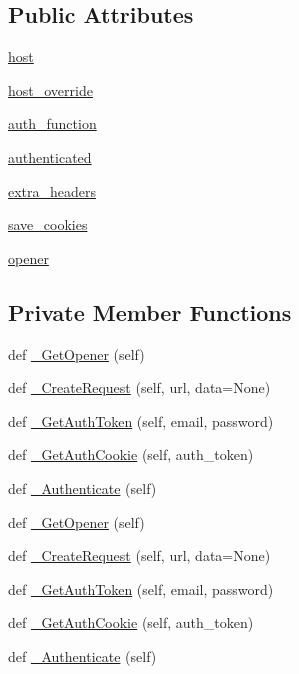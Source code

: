 \subsection*{Public Attributes}
\begin{DoxyCompactItemize}
\item 
\hyperlink{classupload_1_1AbstractRpcServer_ab7188d827e2faddcf970f524f5856192}{host}
\item 
\hyperlink{classupload_1_1AbstractRpcServer_a783a4a7e4ffb776a57a3f267300a213b}{host\+\_\+override}
\item 
\hyperlink{classupload_1_1AbstractRpcServer_aee0090a3bcf07b913a7dd596a5dabb8f}{auth\+\_\+function}
\item 
\hyperlink{classupload_1_1AbstractRpcServer_a692955750c802e461c6336d3000cd365}{authenticated}
\item 
\hyperlink{classupload_1_1AbstractRpcServer_adbbf0109afc13d58d7815fa143cb779f}{extra\+\_\+headers}
\item 
\hyperlink{classupload_1_1AbstractRpcServer_affe342205c4647d41b127f5a5634858b}{save\+\_\+cookies}
\item 
\hyperlink{classupload_1_1AbstractRpcServer_aa931446476e0e86f3ade7fef0a0aea5a}{opener}
\end{DoxyCompactItemize}
\subsection*{Private Member Functions}
\begin{DoxyCompactItemize}
\item 
def \hyperlink{classupload_1_1AbstractRpcServer_a388a9974eab1157ba4785e2ab2c33be9}{\+\_\+\+Get\+Opener} (self)
\item 
def \hyperlink{classupload_1_1AbstractRpcServer_a1553c79619eec0770932cd4fa325243c}{\+\_\+\+Create\+Request} (self, url, data=None)
\item 
def \hyperlink{classupload_1_1AbstractRpcServer_a5a801cc3fdbb8222fa58d41e098f70a7}{\+\_\+\+Get\+Auth\+Token} (self, email, password)
\item 
def \hyperlink{classupload_1_1AbstractRpcServer_a45ba7a36fd840608f532694be6b6a9ae}{\+\_\+\+Get\+Auth\+Cookie} (self, auth\+\_\+token)
\item 
def \hyperlink{classupload_1_1AbstractRpcServer_a8517a9d90ee2478752a53302f01d868d}{\+\_\+\+Authenticate} (self)
\item 
def \hyperlink{classupload_1_1AbstractRpcServer_a388a9974eab1157ba4785e2ab2c33be9}{\+\_\+\+Get\+Opener} (self)
\item 
def \hyperlink{classupload_1_1AbstractRpcServer_a1553c79619eec0770932cd4fa325243c}{\+\_\+\+Create\+Request} (self, url, data=None)
\item 
def \hyperlink{classupload_1_1AbstractRpcServer_a5a801cc3fdbb8222fa58d41e098f70a7}{\+\_\+\+Get\+Auth\+Token} (self, email, password)
\item 
def \hyperlink{classupload_1_1AbstractRpcServer_a45ba7a36fd840608f532694be6b6a9ae}{\+\_\+\+Get\+Auth\+Cookie} (self, auth\+\_\+token)
\item 
def \hyperlink{classupload_1_1AbstractRpcServer_a8517a9d90ee2478752a53302f01d868d}{\+\_\+\+Authenticate} (self)
\end{DoxyCompactItemize}


